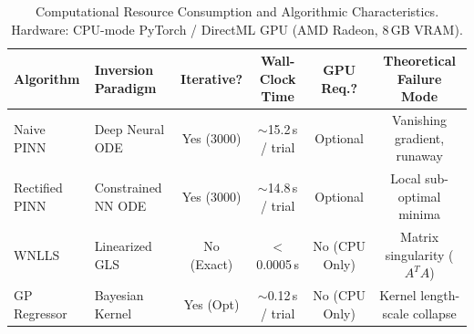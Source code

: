 \begin{table}[htbp]
\centering
\caption{Computational Resource Consumption and Algorithmic Characteristics. Hardware: CPU-mode PyTorch / DirectML GPU (AMD Radeon, 8\,GB VRAM).}
\label{tab:computational_complexity}
\small
\begin{tabular}{llcccc}
\toprule
Algorithm & Inversion Paradigm & Iterative? & Wall-Clock Time & GPU Req.? & Theoretical Failure Mode \\
\midrule
Naive PINN & Deep Neural ODE & Yes (3000) & $\sim$15.2\,s / trial & Optional & Vanishing gradient, runaway \\
Rectified PINN & Constrained NN ODE & Yes (3000) & $\sim$14.8\,s / trial & Optional & Local sub-optimal minima \\
WNLLS & Linearized GLS & No (Exact) & $<$0.0005\,s & No (CPU Only) & Matrix singularity ($A^T A$) \\
GP Regressor & Bayesian Kernel & Yes (Opt) & $\sim$0.12\,s / trial & No (CPU Only) & Kernel length-scale collapse \\
\bottomrule
\end{tabular}
\end{table}